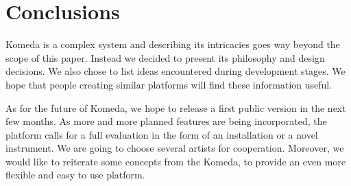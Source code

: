 \documentclass{article}
\begin{document}
\section{Conclusions}

Komeda is a complex system and describing its intricacies goes way beyond the
scope of this paper. Instead we decided to present its philosophy and design
decisions. We also chose to list ideas encountered during development
stages. We hope that people creating similar platforms will find these
information useful.

As for the future of Komeda, we hope to release a first public version in the
next few months. As more and more planned features are being incorporated, the
platform calls for a full evaluation in the form of an installation or a novel
instrument. We are going to choose several artists for cooperation. Moreover,
we would like to reiterate some concepts from the Komeda, to provide an even
more flexible and easy to use platform.


\end{document}
